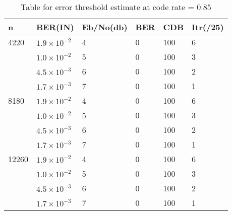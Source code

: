 \begin{table}[H]
\centering
\caption[Table for error threshold estimate at code rate = 0.85, Min Sum decode using quasi cyclic matrix]{Table for error threshold estimate at code rate = 0.85}
\begin{tabular}{|l|l|l|l|l|l|}
\hline
n     & BER(IN) & Eb/No(db) & BER & CDB & Itr(/25) \\ \hline
4220  & $1.9\times10^{-2}$ & 4     & 0   & 100 & 6         \\ \hline
	  & $1.0\times10^{-2}$ & 5     & 0   & 100 & 3         \\
      & $4.5\times10^{-3}$ & 6     & 0   & 100 & 2         \\ 
      & $1.7\times10^{-3}$ & 7     & 0   & 100 & 1         \\ \hline
8180  & $1.9\times10^{-2}$ & 4     & 0   & 100 & 6         \\  \hline
      & $1.0\times10^{-2}$ & 5     & 0   & 100 & 3         \\ 
      & $4.5\times10^{-3}$ & 6     & 0   & 100 & 2         \\ 
      & $1.7\times10^{-3}$ & 7     & 0   & 100 & 1         \\ \hline
12260 & $1.9\times10^{-2}$ & 4     & 0   & 100 & 6         \\  \hline
      & $1.0\times10^{-2}$ & 5     & 0   & 100 & 3         \\ 
      & $4.5\times10^{-3}$ & 6     & 0   & 100 & 2         \\ 
      & $1.7\times10^{-3}$ & 7     & 0   & 100 & 1         \\ \hline
\end{tabular}
\label{tab:nameForThisTable}
\end{table}


